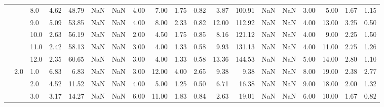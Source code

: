 \begin{tabular}{lllrrrrrrrrrrrrrrrr}
          &     & 8.0  &      4.62 &      48.79 &               NaN &                NaN &  4.00 &   7.00 &             1.75 &                         0.82 &      3.87 &     100.91 &               NaN &                NaN &  3.00 &   5.00 &             1.67 &                         1.15 \\
          &     & 9.0  &      5.09 &      53.85 &               NaN &                NaN &  4.00 &   8.00 &             2.33 &                         0.82 &     12.00 &     112.92 &               NaN &                NaN &  4.00 &  13.00 &             3.25 &                         0.50 \\
          &     & 10.0 &      2.63 &      56.19 &               NaN &                NaN &  2.00 &   4.50 &             1.75 &                         0.85 &      8.16 &     121.12 &               NaN &                NaN &  4.00 &   9.00 &             2.25 &                         1.50 \\
          &     & 11.0 &      2.42 &      58.13 &               NaN &                NaN &  3.00 &   4.00 &             1.33 &                         0.58 &      9.93 &     131.13 &               NaN &                NaN &  4.00 &  11.00 &             2.75 &                         1.26 \\
          &     & 12.0 &      2.35 &      60.65 &               NaN &                NaN &  3.00 &   4.00 &             1.33 &                         0.58 &     13.36 &     144.53 &               NaN &                NaN &  5.00 &  14.00 &             2.80 &                         1.10 \\
          & 2.0 & 1.0  &      6.83 &       6.83 &               NaN &                NaN &  3.00 &  12.00 &             4.00 &                         2.65 &      9.38 &       9.38 &               NaN &                NaN &  8.00 &  19.00 &             2.38 &                         2.77 \\
          &     & 2.0  &      4.52 &      11.52 &               NaN &                NaN &  4.00 &   5.00 &             1.25 &                         0.50 &      6.71 &      16.38 &               NaN &                NaN &  9.00 &  18.00 &             2.00 &                         1.32 \\
          &     & 3.0  &      3.17 &      14.27 &               NaN &                NaN &  6.00 &  11.00 &             1.83 &                         0.84 &      2.63 &      19.01 &               NaN &                NaN &  6.00 &  10.00 &             1.67 &                         0.82 \\

\end{tabular}
